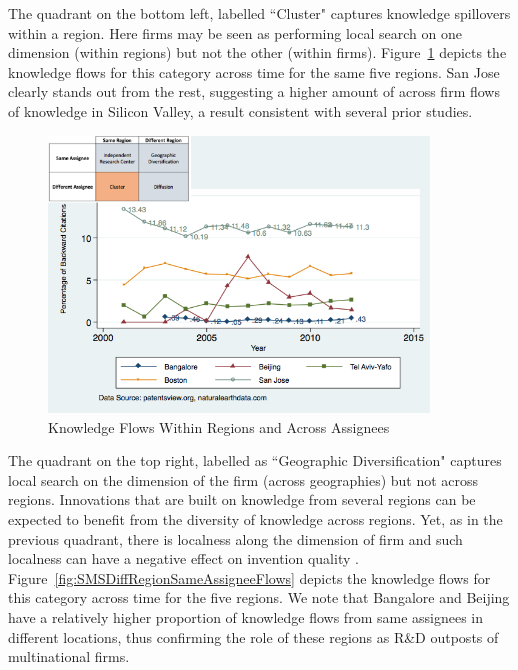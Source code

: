 \documentclass[12pt,letterpaper]{article}
\begin{document}
The quadrant on the bottom left, labelled ``Cluster" captures knowledge spillovers within a region. Here firms may be seen as performing local search on one dimension (within regions) but not the other (within firms). Figure~\ref{fig:SMSSameRegionDiffAssigneeFlows} depicts the knowledge flows for this category across time for the same five regions. San Jose clearly stands out from the rest, suggesting a higher amount of across firm flows of knowledge in Silicon Valley, a result consistent with several prior studies. \par

\begin{figure}[h!]
\begin{centering}
  \caption{\newline Knowledge Flows Within Regions and Across Assignees}
  \label{fig:SMSSameRegionDiffAssigneeFlows}
  \includegraphics[width=0.90\textwidth]{SMSSameRegionDiffAssigneeFlows}
\end{centering}
\end{figure}

The quadrant on the top right, labelled as ``Geographic Diversification" captures local search on the dimension of the firm (across geographies) but not across regions. Innovations that are built on knowledge from several regions can be expected to benefit from the diversity of knowledge across regions. Yet, as in the previous quadrant, there is localness along the dimension of firm and such localness can have a negative effect on invention quality \citep{Rosenkopf2001}. Figure~\ref{fig:SMSDiffRegionSameAssigneeFlows} depicts the  knowledge flows for this category across time for the five regions. We note that Bangalore and Beijing have a relatively higher proportion of knowledge flows from same assignees in different locations, thus confirming the role of these regions as R\&D outposts of multinational firms.\par
\end{document}
